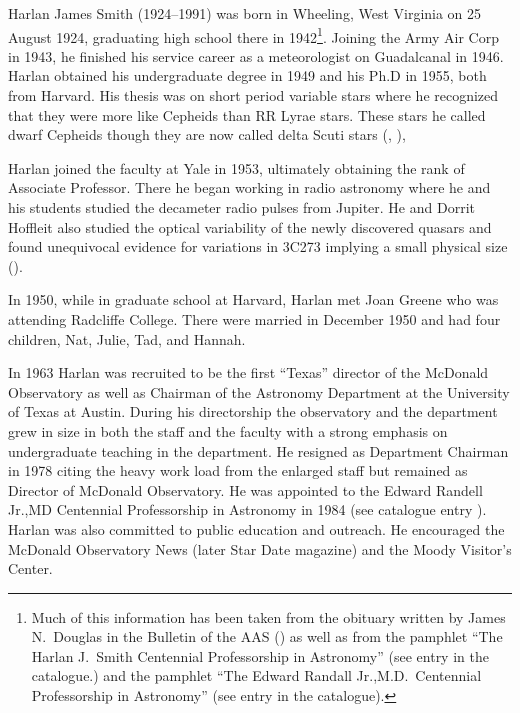 
Harlan James Smith (1924--1991) was born in Wheeling, West Virginia on
25 August 1924, graduating high school there in 1942\footnote{Much of
this information has been taken from the obituary written by James
N.~Douglas in the Bulletin of the AAS (\cite{Douglas1992Harlan}) as
well as from the pamphlet ``The Harlan J.~Smith Centennial
Professorship in Astronomy'' (see entry  in the
catalogue.) and the pamphlet ``The Edward Randall Jr.,M.D.~Centennial
Professorship in Astronomy'' (see entry  in the
catalogue).}. Joining the Army Air Corp in 1943, he finished his
service career as a meteorologist on Guadalcanal in 1946.  Harlan
obtained his undergraduate degree in 1949 and his Ph.D in 1955, both
from Harvard. His thesis was on short period variable stars where he
recognized that they were more like Cepheids than RR Lyrae stars.
These stars he called dwarf Cepheids though they are now called delta
Scuti stars (\cite{HJS1955}, \cite{HJSPhD}),

Harlan joined the faculty at Yale in 1953, ultimately obtaining the rank of
Associate Professor. There he began working in radio astronomy where
he and his students studied the decameter radio pulses from
Jupiter. He and Dorrit Hoffleit also studied the optical variability of
the newly discovered quasars and found unequivocal evidence for
variations in 3C273 implying a small physical size
(\cite{HJS1963}).

In 1950, while in graduate school at Harvard, Harlan met Joan Greene
who was attending Radcliffe College. There were married in December
1950 and had four children, Nat, Julie, Tad, and Hannah.

In 1963 Harlan was recruited to be the first ``Texas'' director of the
McDonald Observatory as well as Chairman of the Astronomy Department
at the University of Texas at Austin. During his directorship the
observatory and the department grew in size in both the staff and the
faculty with a strong emphasis on undergraduate teaching in the
department. He resigned as Department Chairman in 1978 citing the heavy
work load from the enlarged staff but remained as Director of McDonald
Observatory. He was appointed to the Edward Randell Jr.,MD Centennial
Professorship in Astronomy in 1984 (see catalogue
entry ).  Harlan was also committed to public
education and outreach.  He encouraged the McDonald Observatory News
(later Star Date magazine) and the Moody Visitor's Center.

